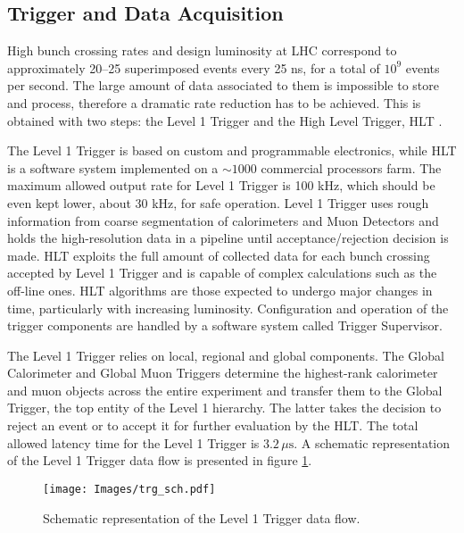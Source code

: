 \subsection{Trigger and Data Acquisition} \label{TRG}
High bunch crossing rates and design luminosity at LHC correspond to approximately 
20--25 superimposed events every 25 ns, for a total of $10^9$ events per second.
The large amount of data associated to them is impossible to store and process,
therefore a dramatic rate reduction has to be achieved. This is obtained with two
steps: the Level 1 Trigger \cite{L1} and the High Level Trigger, HLT \cite{HLT}.

The Level 1 Trigger is based on custom and programmable electronics, while
HLT is a software system implemented on a $\sim1000$ commercial processors farm.
The maximum allowed output rate for Level 1 Trigger is 100 kHz, which should
be even kept lower, about 30 kHz, for safe operation. Level 1 Trigger uses rough
information from coarse segmentation of calorimeters and Muon Detectors and
holds the high-resolution data in a pipeline until acceptance/rejection decision
is made. HLT exploits the full amount of collected data for each bunch crossing 
accepted by Level 1 Trigger and is capable of complex calculations such as
the off-line ones. HLT algorithms are those expected to undergo major changes
in time, particularly with increasing luminosity. Configuration and operation of
the trigger components are handled by a software system called Trigger Supervisor.

The Level 1 Trigger relies on local, regional and global components. The Global
Calorimeter and Global Muon Triggers determine the highest-rank calorimeter and
muon objects across the entire experiment and transfer them to the Global Trigger,
the top entity of the Level 1 hierarchy. The latter takes the decision to reject an
event or to accept it for further evaluation by the HLT. The total allowed latency
time for the Level 1 Trigger is $3.2\,\mu\mathrm{s}$. A schematic representation of the Level 1
Trigger data flow is presented in figure \ref{trg_sch}.
\begin{figure}
\centering
\texttt{[image: Images/trg\_sch.pdf]}
\caption{Schematic representation of the Level 1 Trigger data flow.}
\label{trg_sch}
\end{figure}


